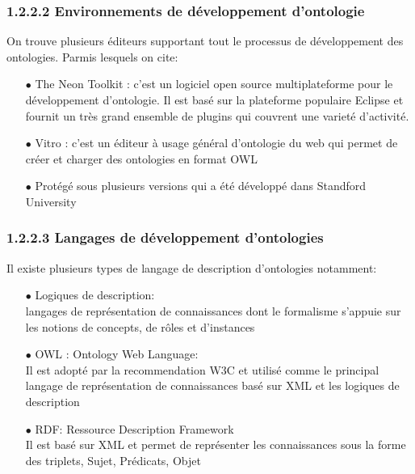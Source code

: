                 \subsubsection{1.2.2.2 Environnements de développement d’ontologie}
                    On trouve plusieurs éditeurs supportant tout le processus de développement des ontologies. Parmis lesquels on cite:\\
                    \begin{itemize}

                        \item[\quad $\bullet$]The Neon Toolkit : c'est un logiciel open source multiplateforme pour le développement d'ontologie. Il est basé sur la plateforme populaire Eclipse et fournit un très grand ensemble de plugins qui couvrent une varieté d'activité. \\
                        \item[\quad $\bullet$]Vitro : c'est un éditeur à usage général d'ontologie du web qui permet de créer et charger des ontologies en format OWL
                        \item[\quad $\bullet$]Protégé sous plusieurs versions qui a été développé dans Standford University\\
                    \end{itemize}
                \subsubsection{1.2.2.3 Langages de développement d’ontologies}
                Il existe plusieurs types de langage de description d'ontologies notamment:
                    \begin{itemize}
                         \item[\quad $\bullet$]Logiques de description:\\
                          langages de représentation de connaissances dont le formalisme s’appuie sur les notions de concepts, de rôles et d’instances

                         \item[\quad $\bullet$]OWL : Ontology Web Language:\\
                          Il est adopté par la recommendation W3C et utilisé comme le principal langage de représentation de connaissances basé sur XML et les logiques de description

                         \item[\quad $\bullet$]RDF: Ressource Description Framework\\
                          Il est basé sur XML et permet de représenter les connaissances sous la forme des triplets, Sujet, Prédicats, Objet

                         \end{itemize}
